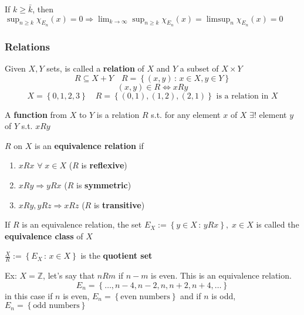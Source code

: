     If \(k \geq \bar{k}\), then \(\sup_{n \geq k} \chi_{E_n} (x) = 0 \Rightarrow \lim_{k \to \infty} \sup_{n \geq k} \chi_{E_n}(x) = \limsup_n \chi_{E_n} (x) = 0\)

    \subsubsection*{Relations}
    Given \(X, Y\) sets, is called a \textbf{relation} of \(X\) and \(Y\) a subset of \(X \times Y\)
    \[
        R \subseteq X + Y \quad R = \left\lbrace (x,y) \, : \, x \in X, y \in Y \right\rbrace
    \]
    \[
        (x,y) \in R \Leftrightarrow xRy
    \]
    \[
        X = \left\lbrace 0,1,2,3 \right\rbrace \quad R = \left\lbrace (0,1), (1,2), (2,1) \right\rbrace \mbox{ is a relation in } X
    \]
\begin{definition}
    A \textbf{function} from \(X\) to \(Y\) is a relation \(R\) s.t. for any element \(x\) of \(X\) \(\exists !\) element \(y\) of \(Y\) s.t. \(xRy\)
\end{definition}
\begin{definition}
    \(R\) on \(X\) is an \textbf{equivalence relation} if 
    \begin{enumerate}
        \item \(xRx\) \(\forall \; x \in X\) (\(R\) is \textbf{reflexive})
        \item \(xRy \Rightarrow yRx\) (\(R\) is \textbf{symmetric})
        \item \(xRy, yRz \Rightarrow xRz\) (\(R\) is \textbf{transitive})
    \end{enumerate}
    If \(R\) is an equivalence relation, the set 
    \(
        E_X := \left\lbrace y \in X \, : \, yRx \right\rbrace, \; x \in X
    \)
    is called the \textbf{equivalence class} of \(X\)
\end{definition}
\begin{definition}
    \(\frac{X}{R} := \left\lbrace E_X \, : \, x \in X \right\rbrace\) is the \textbf{quotient set}
\end{definition}
Ex: \(X = \mathbb{Z}\), let's say that \(nRm\) if \(n-m\) is even. This is an equivalence relation.
\[
    E_n = \left\lbrace \ldots, n-4, n-2, n, n+2, n+4, \ldots \right\rbrace
\]
in this case if \(n\) is even, \(E_n = \left\lbrace \mbox{even numbers} \right\rbrace\) and if \(n\) is odd, \(E_n = \left\lbrace \mbox{odd numbers} \right\rbrace\)
